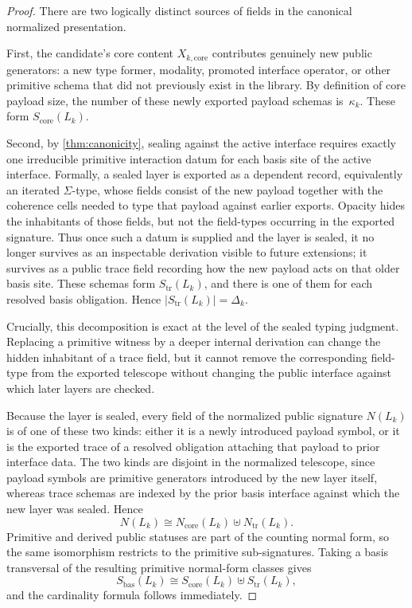 \documentclass{lmcs}
\begin{document}
\begin{proof}
There are two logically distinct sources of fields in the canonical normalized
presentation.

First, the candidate's core content $X_{k,\mathrm{core}}$ contributes genuinely new public generators: a new type former, modality, promoted interface operator, or other primitive schema that did not previously exist in the library. By definition of core payload size, the number of these newly exported payload schemas is~$\kappa_k$. These form $S_{\mathrm{core}}(L_k)$.

Second, by \autoref{thm:canonicity}, sealing against the active interface requires exactly one irreducible primitive interaction datum for each basis site of the active interface. Formally, a sealed layer is exported as a dependent record, equivalently an iterated $\Sigma$-type, whose fields consist of the new payload together with the coherence cells needed to type that payload against earlier exports. Opacity hides the inhabitants of those fields, but not the field-types occurring in the exported signature. Thus once such a datum is supplied and the layer is sealed, it no longer survives as an inspectable derivation visible to future extensions; it survives as a public trace field recording how the new payload acts on that older basis site. These schemas form $S_{\mathrm{tr}}(L_k)$, and there is one of them for each resolved basis obligation. Hence $|S_{\mathrm{tr}}(L_k)|=\Delta_k$.

Crucially, this decomposition is exact at the level of the sealed typing judgment. Replacing a primitive witness by a deeper internal derivation can change the hidden inhabitant of a trace field, but it cannot remove the corresponding field-type from the exported telescope without changing the public interface against which later layers are checked.

Because the layer is sealed, every field of the normalized public signature
$N(L_k)$ is of one of these two kinds: either it is a newly introduced payload
symbol, or it is the exported trace of a resolved obligation attaching that
payload to prior interface data. The two kinds are disjoint in the normalized
telescope, since payload symbols are primitive generators introduced by the
new layer itself, whereas trace schemas are indexed by the prior basis
interface against which the new layer was sealed. Hence
\[
  N(L_k) \cong N_{\mathrm{core}}(L_k) \uplus N_{\mathrm{tr}}(L_k).
\]
Primitive and derived public statuses are part of the counting normal form, so the same
isomorphism restricts to the primitive sub-signatures. Taking a basis
transversal of the resulting primitive normal-form classes gives
\[
  S_{\mathrm{bas}}(L_k) \cong S_{\mathrm{core}}(L_k) \uplus S_{\mathrm{tr}}(L_k),
\]
and the cardinality formula follows immediately.
\end{proof}
\end{document}
